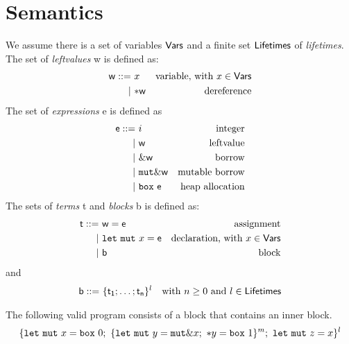 \section{Semantics}\label{sec:semantics}

\begin{definition}
  We assume there is a set of variables $\mathsf{Vars}$
  and a finite set $\mathsf{Lifetimes}$ of \emph{lifetimes}.
  The set of \emph{leftvalues} \textsf{w} is defined as:
  \begin{align*}
    \mathsf{w} ::= &\ x & \text{variable, with $x\in\mathsf{Vars}$}\\
    | &\ \mathtt{*}\mathsf{w} & \text{dereference}
  \end{align*}
  The set of \emph{expressions} \textsf{e} is defined as
  \begin{align*}
    \mathsf{e} ::= &\ i & \text{integer}\\
    | &\ \mathsf{w} & \text{leftvalue}\\
    | &\ \&\mathsf{w} & \text{borrow}\\
    | &\ \mathtt{mut}\&\mathsf{w} & \text{mutable borrow}\\
    | &\ \mathtt{box}\ \mathsf{e} & \text{heap allocation}
  \end{align*}
  The sets of \emph{terms} \textsf{t} and \emph{blocks} \textsf{b}
  is defined as:
  \begin{align*}
    \mathsf{t} ::= &\ \mathsf{w}=\mathsf{e} & \text{assignment}\\
    | &\ \mathtt{let\ mut}\ x=\mathsf{e} & \text{declaration, with $x\in\mathsf{Vars}$}\\
    | &\ \mathsf{b} & \text{block}
  \end{align*}
  and
  \begin{align*}
    \mathsf{b} ::= &\ \{\mathsf{t_1};\ldots;\mathsf{t_n}\}^l & \text{with $n\ge 0$ and $l\in\mathsf{Lifetimes}$}
  \end{align*}
\end{definition}

\begin{example}\label{ex:program}
  The following valid program consists of a block that contains an inner block.
  \[
    \{
      \mathtt{let\ mut}\ x = \mathtt{box}\ 0;\
      \{\mathtt{let\ mut}\ y = \mathtt{mut}\& x;\
      \mathtt{*}y = \mathtt{box}\ 1\}^m;\
      \mathtt{let\ mut}\ z = x
    \}^l
  \]
\end{example}


